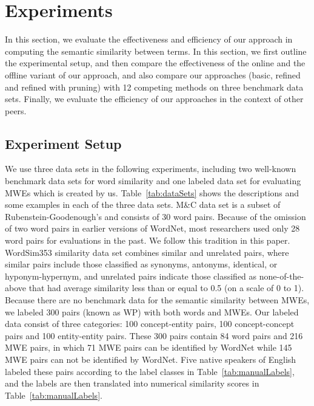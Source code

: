 \section{Experiments}
\label{sec:eval}

In this section, we evaluate the effectiveness and efficiency of
our approach in computing the semantic similarity between terms.
In this section, we first outline the experimental setup,
and then compare the effectiveness of the online and the offline
variant of our approach, and also compare our approaches
(basic, refined and refined with pruning) with 12 competing
methods on three benchmark data sets.
Finally, we evaluate the efficiency of our approaches in
the context of other peers.

\subsection{Experiment Setup}
We use three data sets in the following experiments,
including two well-known benchmark data sets for word similarity and
one labeled data set for evaluating MWEs which is created by us.
Table~\ref{tab:dataSets} shows the descriptions and some examples in
each of the three data sets.
M\&C data set is a subset of Rubenstein-Goodenough's \cite{Rubenstein:1965}
and consists of 30 word pairs.
Because of the omission of two word pairs in earlier versions of WordNet,
most researchers used only 28 word pairs for evaluations in the past.
We follow this tradition in this paper.
WordSim353 similarity data set combines similar and unrelated pairs,
where similar pairs include those classified as synonyms, antonyms, identical,
or hyponym-hypernym, and unrelated pairs indicate those classified
as none-of-the-above that had average similarity less than or equal to 0.5
(on a scale of 0 to 1). Because there are no benchmark data for
the semantic similarity between MWEs,
we labeled 300 pairs (known as WP) with both words and MWEs.
Our labeled data consist of three categories: 100 concept-entity pairs,
100 concept-concept pairs and 100 entity-entity pairs. These 300 pairs contain 84 word pairs and 216 MWE pairs, in which 71 MWE pairs can be identified by WordNet while 145 MWE pairs can not be identified by WordNet.
Five native speakers of English labeled these pairs according to
the label classes in Table~\ref{tab:manualLabels}, and the labels
are then translated into numerical similarity scores
in Table~\ref{tab:manualLabels}.

